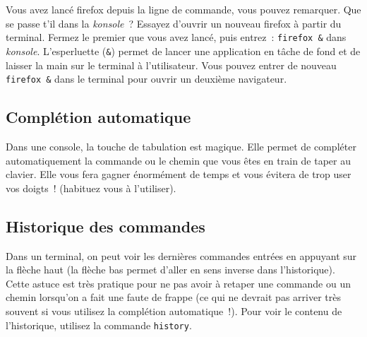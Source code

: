 \documentclass[12pt,a4paper]{article}
\begin{document}
Vous avez lancé firefox depuis la ligne de commande, vous
pouvez remarquer. Que se passe t'il dans la \textit{konsole}~? 
Essayez d'ouvrir un nouveau firefox à partir du terminal. Fermez le
premier que vous avez lancé, puis entrez~: \verb+firefox &+ dans
\textit{konsole}. L’esperluette 
(\verb+&+) permet de lancer une application en tâche de fond et de
laisser la main sur le terminal à l'utilisateur. Vous pouvez entrer de
nouveau \verb+firefox &+ dans le terminal pour ouvrir un deuxième
navigateur. 

\subsection{Complétion automatique}

Dans une console, la touche de tabulation est magique. Elle permet de
compléter automatiquement la commande ou le chemin que vous êtes en
train de taper au clavier. Elle vous fera gagner énormément de temps
et vous évitera de trop user vos doigts~! (habituez vous à
l'utiliser).

\subsection{Historique des commandes}

Dans un terminal, on peut voir les dernières commandes entrées en
appuyant sur la flèche haut (la flèche bas permet d'aller en sens
inverse dans l'historique). Cette astuce est très pratique pour ne pas
avoir à retaper une commande ou un chemin lorsqu'on a fait une faute
de frappe (ce qui ne devrait pas arriver très souvent si vous utilisez
la complétion automatique~!). Pour voir le contenu de l'historique,
utilisez la commande {\tt history}.
\end{document}
